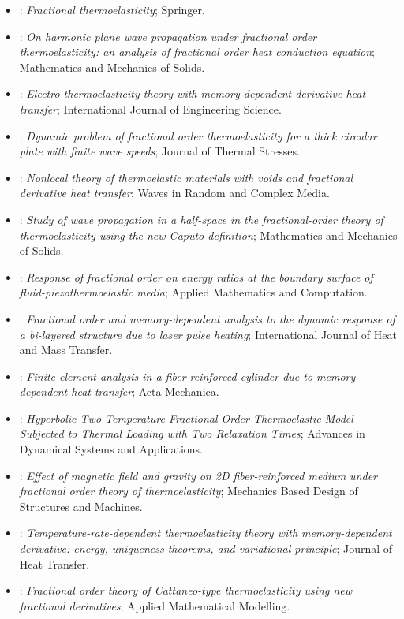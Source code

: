 \begin{itemize}
\item \citet{Povstenko2016}: \emph{Fractional thermoelasticity}; Springer.
\item \citet{Tiwari2015}: \emph{On harmonic plane wave propagation under fractional order thermoelasticity: an analysis of fractional order heat conduction equation}; Mathematics and Mechanics of Solids.
\item \citet{Ezzat2016a}: \emph{Electro-thermoelasticity theory with memory-dependent derivative heat transfer}; International Journal of Engineering Science.
\item \citet{Tripathi2016}: \emph{Dynamic problem of fractional order thermoelasticity for a thick circular plate with finite wave speeds}; Journal of Thermal Stresses.
\item \citet{Bachher2019}: \emph{Nonlocal theory of thermoelastic materials with voids and fractional derivative heat transfer}; Waves in Random and Complex Media.
\item \citet{Sherief2018}: \emph{Study of wave propagation in a half-space in the fractional-order theory of thermoelasticity using the new Caputo definition}; Mathematics and Mechanics of Solids.
\item \citet{Kumar2019}: \emph{Response of fractional order on energy ratios at the boundary surface of fluid-piezothermoelastic media}; Applied Mathematics and Computation.
\item \citet{Li2019}: \emph{Fractional order and memory-dependent analysis to the dynamic response of a bi-layered structure due to laser pulse heating}; International Journal of Heat and Mass Transfer.
\item \citet{Sur2019}: \emph{Finite element analysis in a fiber-reinforced cylinder due to memory-dependent heat transfer}; Acta Mechanica.
\item \citet{Bassiouny2020}: \emph{Hyperbolic Two Temperature Fractional-Order Thermoelastic Model Subjected to Thermal Loading with Two Relaxation Times}; Advances in Dynamical Systems and Applications.
\item \citet{Ma2020}: \emph{Effect of magnetic field and gravity on 2D fiber-reinforced medium under fractional order theory of thermoelasticity}; Mechanics Based Design of Structures and Machines.
\item \citet{Singh2020d}: \emph{Temperature-rate-dependent thermoelasticity theory with memory-dependent derivative: energy, uniqueness theorems, and variational principle}; Journal of Heat Transfer.
\item \citet{Yu2020}: \emph{Fractional order theory of Cattaneo-type thermoelasticity using new fractional derivatives}; Applied Mathematical Modelling.

\end{itemize}
